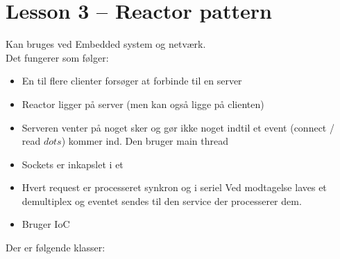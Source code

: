 \documentclass[oneside, 10pt]{memoir}
\begin{document}
\newpage
\section{Lesson 3 -- Reactor pattern}

Kan bruges ved Embedded system og netværk.
\\
Det fungerer som følger:

\begin{itemize}
\item En til flere clienter forsøger at forbinde til en server
\item Reactor ligger på server (men kan også ligge på clienten)

\item Serveren venter på noget sker og gør ikke noget indtil et event (connect / read $dots$) kommer ind.
\subitem Den bruger main thread

\item Sockets er inkapslet i et 
\item Hvert request er processeret synkron og i seriel
\subitem Ved modtagelse laves et demultiplex og eventet sendes til den service der processerer dem.
\item Bruger IoC
\end{itemize}
Der er følgende klasser:
\end{document}
